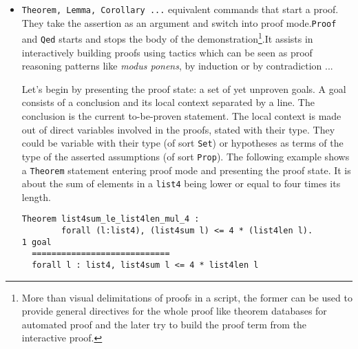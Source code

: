 \documentclass{article}
\begin{document}
\begin{itemize}
            \item \texttt{Theorem, Lemma, Corollary ...} equivalent commands that start a proof. They take the assertion as an argument and switch into proof mode.\texttt{Proof} and \texttt{Qed} starts and stops the body of the demonstration\footnote{More than visual delimitations of proofs in a script, the former can be used to provide general directives for the whole proof like theorem databases for automated proof and the later try to build the proof term from the interactive proof.}.It assists in interactively building proofs using tactics which can be seen as proof reasoning patterns like \textit{modus ponens}, by induction or by contradiction ...\par Let's begin by presenting the proof state: a set of yet unproven goals. A goal consists of a conclusion and its local context separated by a line. The conclusion is the current to-be-proven statement. The local context is made out of direct variables involved in the proofs, stated with their type. They could be variable with their type (of sort \texttt{Set}) or hypotheses as terms of the type of the asserted assumptions (of sort \texttt{Prop}). The following example shows a \texttt{Theorem} statement entering proof mode and presenting the proof state. It is about the sum of elements in a \texttt{list4} being lower or equal to four times its length.
            \begin{verbatim}Theorem list4sum_le_list4len_mul_4 : 
        forall (l:list4), (list4sum l) <= 4 * (list4len l).
1 goal
  ============================
  forall l : list4, list4sum l <= 4 * list4len l\end{verbatim}
            
        \end{itemize}
\end{document}
